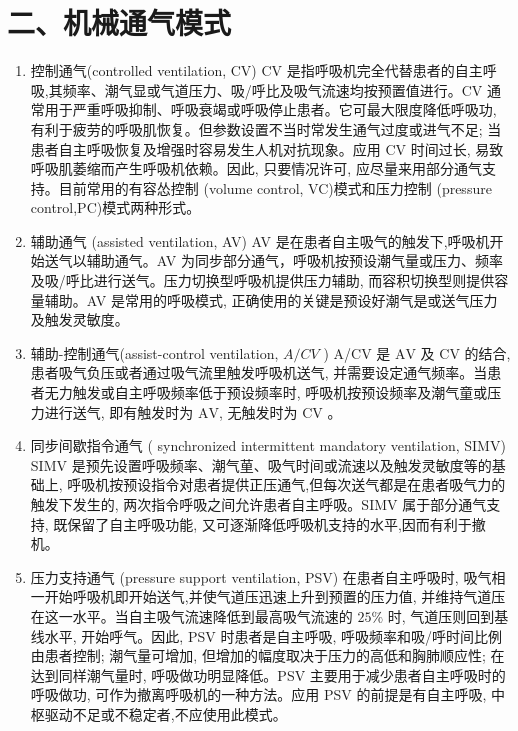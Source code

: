 \documentclass[10pt]{article}
\begin{document}
\section*{二、机械通气模式}
\begin{enumerate}
  \item 控制通气(controlled ventilation, CV) CV 是指呼吸机完全代替患者的自主呼吸,其频率、潮气显或气道压力、吸/呼比及吸气流速均按预置值进行。CV 通常用于严重呼吸抑制、呼吸衰竭或呼吸停止患者。它可最大限度降低呼吸功, 有利于疲劳的呼吸肌恢复。但参数设置不当时常发生通气过度或进气不足; 当患者自主呼吸恢复及增强时容易发生人机对抗现象。应用 CV 时间过长, 易致呼吸肌萎缩而产生呼吸机依赖。因此, 只要情况许可, 应尽量来用部分通气支持。目前常用的有容怂控制 (volume control, VC)模式和压力控制 (pressure control,PC)模式两种形式。

  \item 辅助通气 (assisted ventilation, AV) AV 是在患者自主吸气的触发下,呼吸机开始送气以辅助通气。AV 为同步部分通气，呼吸机按预设潮气量或压力、频率及吸/呼比进行送气。压力切换型呼吸机提供压力辅助, 而容积切换型则提供容量辅助。AV 是常用的呼吸模式, 正确使用的关键是预设好潮气是或送气压力及触发灵敏度。

  \item 辅助-控制通气(assist-control ventilation, $A / C V$ ) A/CV 是 $\mathrm{AV}$ 及 $\mathrm{CV}$ 的结合, 患者吸气负压或者通过吸气流里触发呼吸机送气, 并需要设定通气频率。当患者无力触发或自主呼吸频率低于预设频率时, 呼吸机按预设频率及潮气童或压力进行送气, 即有触发时为 $\mathrm{AV}$, 无触发时为 $\mathrm{CV}$ 。

  \item 同步间歇指令通气 ( synchronized intermittent mandatory ventilation, SIMV) SIMV 是预先设置呼吸频率、潮气荲、吸气时间或流速以及触发灵敏度等的基础上, 呼吸机按预设指令对患者提供正压通气,但每次送气都是在患者吸气力的触发下发生的, 两次指令呼吸之间允许患者自主呼吸。SIMV 属于部分通气支持, 既保留了自主呼吸功能, 又可逐渐降低呼吸机支持的水平,因而有利于撤机。

  \item 压力支持通气 (pressure support ventilation, PSV) 在患者自主呼吸时, 吸气相一开始呼吸机即开始送气,并使气道压迅速上升到预置的压力值, 并维持气道压在这一水平。当自主吸气流速降低到最高吸气流速的 $25 \%$ 时, 气道压则回到基线水平, 开始呼气。因此, PSV 时患者是自主呼吸, 呼吸频率和吸/呼时间比例由患者控制; 潮气量可增加, 但增加的幅度取决于压力的高低和胸肺顺应性; 在达到同样潮气量时, 呼吸做功明显降低。PSV 主要用于减少患者自主呼吸时的呼吸做功, 可作为撤离呼吸机的一种方法。应用 PSV 的前提是有自主呼吸, 中枢驱动不足或不稳定者,不应使用此模式。


\end{enumerate}
\end{document}
